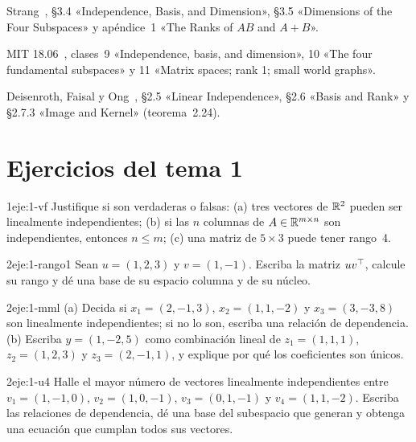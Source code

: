 \begin{lecturas}
\item Strang~\cite{strang-ila}, §3.4 «Independence, Basis, and Dimension», §3.5 «Dimensions of the Four Subspaces» y apéndice~1 «The Ranks of $AB$ and $A+B$».
\item MIT 18.06~\cite{mit1806}, clases~9 «Independence, basis, and dimension», 10 «The four fundamental subspaces» y 11 «Matrix spaces; rank 1; small world graphs».
\item Deisenroth, Faisal y Ong~\cite{mml}, §2.5 «Linear Independence», §2.6 «Basis and Rank» y §2.7.3 «Image and Kernel» (teorema~2.24).
\end{lecturas}

\section*{Ejercicios del tema 1}

\begin{ejercicio}{1}{eje:1-vf}
Justifique si son verdaderas o falsas: (a) tres vectores de $\mathbb{R}^{2}$ pueden ser linealmente independientes; (b) si las $n$ columnas de $A\in\mathbb{R}^{m\times n}$ son independientes, entonces $n\le m$; (c) una matriz de $5\times 3$ puede tener rango~4.
\end{ejercicio}

\begin{ejercicio}{2}{eje:1-rango1}
Sean $u=(1,2,3)$ y $v=(1,-1)$. Escriba la matriz $uv^{\top}$, calcule su rango y dé una base de su espacio columna y de su núcleo.
\end{ejercicio}

\begin{ejercicio}{2}{eje:1-mml}
(a) Decida si $x_1=(2,-1,3)$, $x_2=(1,1,-2)$ y $x_3=(3,-3,8)$ son linealmente independientes; si no lo son, escriba una relación de dependencia. (b) Escriba $y=(1,-2,5)$ como combinación lineal de $z_1=(1,1,1)$, $z_2=(1,2,3)$ y $z_3=(2,-1,1)$, y explique por qué los coeficientes son únicos.
\end{ejercicio}

\begin{ejercicio}{2}{eje:1-u4}
Halle el mayor número de vectores linealmente independientes entre $v_1=(1,-1,0)$, $v_2=(1,0,-1)$, $v_3=(0,1,-1)$ y $v_4=(1,1,-2)$. Escriba las relaciones de dependencia, dé una base del subespacio que generan y obtenga una ecuación que cumplan todos sus vectores.
\end{ejercicio}

